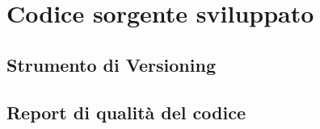 \chapter{Codice sorgente sviluppato}

\section{Strumento di Versioning}

\section{Report di qualità del codice}